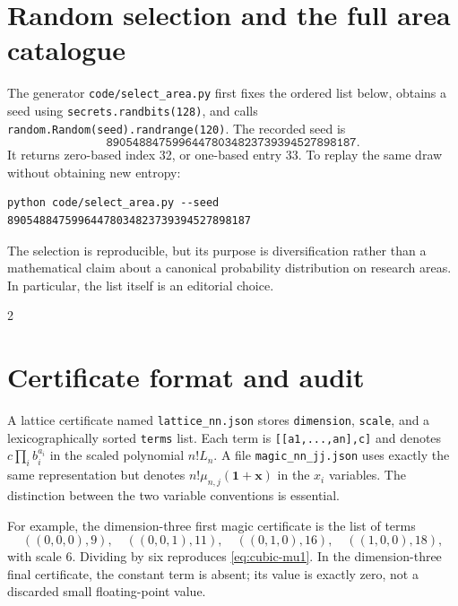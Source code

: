 \documentclass[11pt]{article}
\theoremstyle{definition}
\newcommand{\xx}{\mathbf x}
\newcommand{\one}{\mathbf 1}
\numberwithin{equation}{section}
\begin{document}
\appendix
\section{Random selection and the full area catalogue}
\label{app:selection}
The generator \texttt{code/select\_area.py} first fixes the ordered list
below, obtains a seed using \texttt{secrets.randbits(128)}, and calls
\texttt{random.Random(seed).randrange(120)}. The recorded seed is
\[
 \texttt{89054884759964478034823739394527898187}.
\]
It returns zero-based index 32, or one-based entry 33. To replay the same
draw without obtaining new entropy:
\begin{lstlisting}
python code/select_area.py --seed 89054884759964478034823739394527898187
\end{lstlisting}
The selection is reproducible, but its purpose is diversification rather
than a mathematical claim about a canonical probability distribution on
research areas. In particular, the list itself is an editorial choice.

\begin{multicols}{2}
\small

\end{multicols}

\section{Certificate format and audit}
\label{app:format}
A lattice certificate named \texttt{lattice\_nn.json} stores
\texttt{dimension}, \texttt{scale}, and a lexicographically sorted
\texttt{terms} list. Each term is \texttt{[[a1,...,an],c]} and denotes
$c\prod_i b_i^{a_i}$ in the scaled polynomial $n!L_n$.
A file \texttt{magic\_nn\_jj.json} uses exactly the same representation
but denotes $n!\mu_{n,j}(\one+\xx)$ in the $x_i$ variables.
The distinction between the two variable conventions is essential.

For example, the dimension-three first magic certificate is the list of
terms
\[
 ((0,0,0),9),\quad ((0,0,1),11),\quad
 ((0,1,0),16),\quad ((1,0,0),18),
\]
with scale $6$. Dividing by six reproduces
\eqref{eq:cubic-mu1}. In the dimension-three final certificate, the
constant term is absent; its value is exactly zero, not a discarded small
floating-point value.
\end{document}

